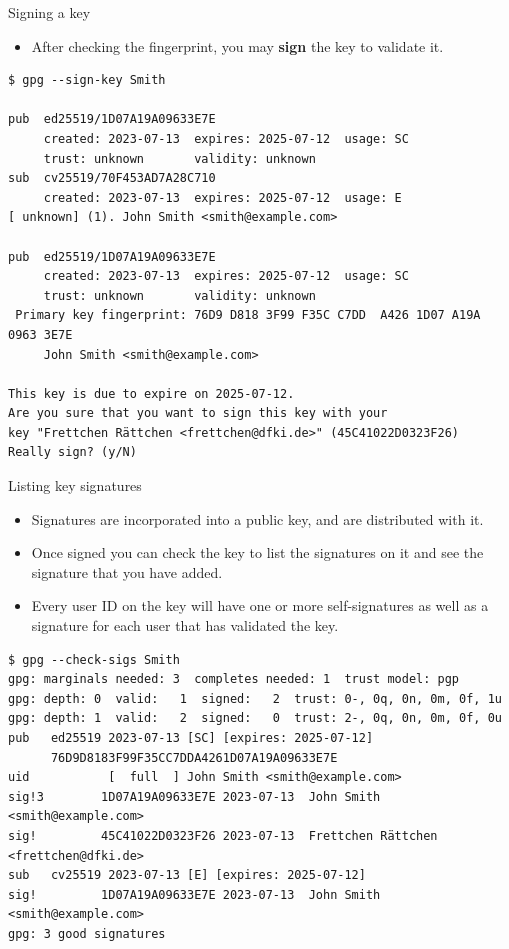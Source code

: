 \documentclass[
mode=present,
paper=smartboard,
size=20pt,
]{powerdot}
\newcommand\vsp{\vspace{-16mm}}
\begin{document}
\makeatletter\renewcommand{\verbatim@font}{\scriptsize\tt}\makeatother
\begin{slide}[method=direct]{Signing a key}
  \begin{itemize}
  \item After checking the fingerprint, you may \textbf{sign} the key
    to validate it.
  \end{itemize}
\vsp
\begin{verbatim}
$ gpg --sign-key Smith

pub  ed25519/1D07A19A09633E7E
     created: 2023-07-13  expires: 2025-07-12  usage: SC  
     trust: unknown       validity: unknown
sub  cv25519/70F453AD7A28C710
     created: 2023-07-13  expires: 2025-07-12  usage: E   
[ unknown] (1). John Smith <smith@example.com>

pub  ed25519/1D07A19A09633E7E
     created: 2023-07-13  expires: 2025-07-12  usage: SC  
     trust: unknown       validity: unknown
 Primary key fingerprint: 76D9 D818 3F99 F35C C7DD  A426 1D07 A19A 0963 3E7E
     John Smith <smith@example.com>

This key is due to expire on 2025-07-12.
Are you sure that you want to sign this key with your
key "Frettchen Rättchen <frettchen@dfki.de>" (45C41022D0323F26)
Really sign? (y/N)
\end{verbatim}
\end{slide}

\begin{slide}[method=direct]{Listing key signatures}
  \begin{itemize}
  \item Signatures are incorporated into a public key, and are
    distributed with it.
  \item Once signed you can check the key to list the signatures on it
    and see the signature that you have added.
  \item Every user ID on the key will have one or more self-signatures
    as well as a signature for each user that has validated the key.
  \end{itemize}
\vsp
\begin{verbatim}
$ gpg --check-sigs Smith
gpg: marginals needed: 3  completes needed: 1  trust model: pgp
gpg: depth: 0  valid:   1  signed:   2  trust: 0-, 0q, 0n, 0m, 0f, 1u
gpg: depth: 1  valid:   2  signed:   0  trust: 2-, 0q, 0n, 0m, 0f, 0u
pub   ed25519 2023-07-13 [SC] [expires: 2025-07-12]
      76D9D8183F99F35CC7DDA4261D07A19A09633E7E
uid           [  full  ] John Smith <smith@example.com>
sig!3        1D07A19A09633E7E 2023-07-13  John Smith <smith@example.com>
sig!         45C41022D0323F26 2023-07-13  Frettchen Rättchen <frettchen@dfki.de>
sub   cv25519 2023-07-13 [E] [expires: 2025-07-12]
sig!         1D07A19A09633E7E 2023-07-13  John Smith <smith@example.com>
gpg: 3 good signatures
\end{verbatim}
\end{slide}
\end{document}
